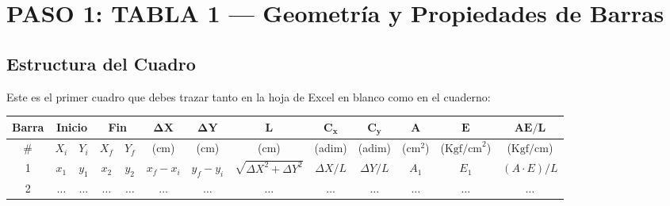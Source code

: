 \documentclass[10pt,a4paper]{article}
\begin{document}
\newpage

\section{PASO 1: TABLA 1 — Geometría y Propiedades de Barras}

\subsection{Estructura del Cuadro}
Este es el primer cuadro que debes trazar tanto en la hoja de Excel en blanco como en el cuaderno:

\begin{center}
\small
\begin{tabular}{|c|c|c|c|c|c|c|c|c|c|c|c|c|}
\hline
\rowcolor{pastelGreen}
\textbf{Barra} & \multicolumn{2}{c|}{\textbf{Inicio}} & \multicolumn{2}{c|}{\textbf{Fin}} & $\mathbf{\Delta X}$ & $\mathbf{\Delta Y}$ & $\mathbf{L}$ & $\mathbf{C_x}$ & $\mathbf{C_y}$ & $\mathbf{A}$ & $\mathbf{E}$ & $\mathbf{AE/L}$ \\
\hline
\rowcolor{pastelGreen}
\# & $X_i$ & $Y_i$ & $X_f$ & $Y_f$ & (cm) & (cm) & (cm) & (adim) & (adim) & ($\text{cm}^2$) & ($\text{Kgf/cm}^2$) & ($\text{Kgf/cm}$) \\
\hline
1 & $x_1$ & $y_1$ & $x_2$ & $y_2$ & $x_f - x_i$ & $y_f - y_i$ & $\sqrt{\Delta X^2+\Delta Y^2}$ & $\Delta X/L$ & $\Delta Y/L$ & $A_1$ & $E_1$ & $(A \cdot E)/L$ \\
2 & $\dots$ & $\dots$ & $\dots$ & $\dots$ & $\dots$ & $\dots$ & $\dots$ & $\dots$ & $\dots$ & $\dots$ & $\dots$ & $\dots$ \\
\hline
\end{tabular}
\end{center}
\end{document}
